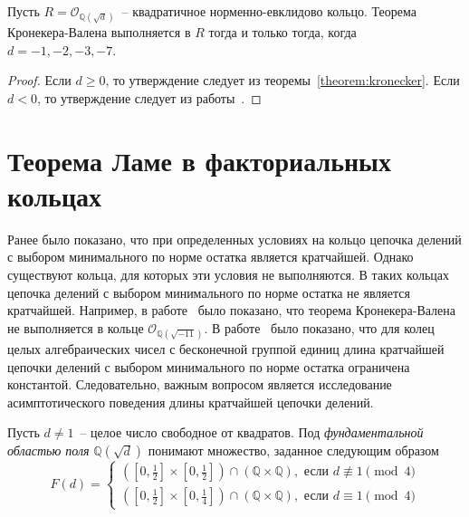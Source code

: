 \documentclass[_00_dissertation.tex]{subfiles}
\begin{document}
\begin{corollary}
    Пусть $R = \mathcal{O}_{\mathbb{Q}(\sqrt{d})}$~-- квадратичное норменно-евклидово кольцо.
    Теорема Кронекера-Валена выполняется в $R$ тогда и только тогда, когда $d=-1, -2, -3, -7$.
\end{corollary}
\begin{proof}
    Если $d \ge 0$, то утверждение следует из теоремы~\ref{theorem:kronecker}.
    Если $d < 0$, то утверждение следует из работы~\cite[с.~322]{source:Rolletschek_1990}.
\end{proof}

\section{Теорема Ламе в факториальных кольцах}

Ранее было показано, что при определенных условиях на кольцо цепочка делений с выбором минимального по норме остатка является кратчайшей.
Однако существуют кольца, для которых эти условия не выполняются.
В таких кольцах цепочка делений с выбором минимального по норме остатка не является кратчайшей.
Например, в работе~\cite[с.~322]{source:Rolletschek_1990} было показано, что теорема Кронекера-Валена не выполняется в кольце $\mathcal{O}_{\mathbb{Q}(\sqrt{-11})}$.
В работе~\cite[с.~483]{source:Cooke} было показано, что для колец целых алгебраических чисел с бесконечной группой единиц длина кратчайшей цепочки делений с выбором минимального по норме остатка ограничена константой.
Следовательно, важным вопросом является исследование асимптотического поведения длины кратчайшей цепочки делений.

\begin{definition}
    Пусть $d \neq 1$~-- целое число свободное от квадратов.
    Под \emph{фундаментальной областью поля} $\mathbb{Q}(\sqrt{d})$ понимают множество, заданное следующим образом
    \begin{equation*}
        F(d) = \begin{cases}
            \left(
                \left[0, \frac{1}{2}\right] \times \left[0, \frac{1}{2}\right]
            \right) \cap \left(
                \mathbb{Q} \times \mathbb{Q}
            \right), \textrm{ если } d \not\equiv 1 \pmod 4\\
            \left(
                \left[0, \frac{1}{2}\right] \times \left[0, \frac{1}{4}\right]
            \right) \cap \left(
                \mathbb{Q} \times \mathbb{Q}
            \right), \textrm{ если } d \equiv 1 \pmod 4
        \end{cases}
    \end{equation*}
\end{definition}
\end{document}
